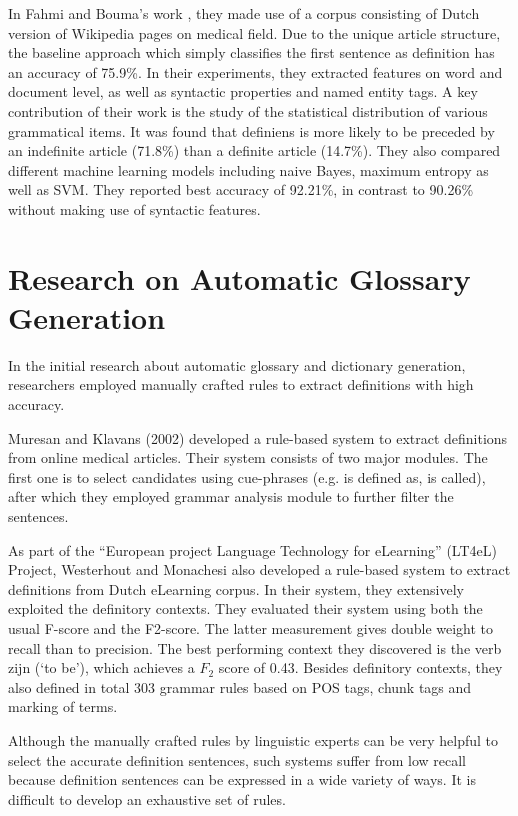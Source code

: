 \documentclass[hyp]{socreport}
\begin{document}
In Fahmi and Bouma's work \cite{Fahmi06learningto}, they made use of a corpus consisting of Dutch version of Wikipedia pages on medical field. Due to the unique article structure, the baseline approach which simply classifies the first sentence as definition has an accuracy of 75.9\%. In their experiments, they extracted features on word and document level, as well as syntactic properties and named entity tags. A key contribution of their work is the study of the statistical distribution of various grammatical items. It was found that definiens is more likely to be preceded by an indefinite article (71.8\%) than a definite article (14.7\%). They also compared different machine learning models including naive Bayes, maximum entropy as well as SVM. They reported best accuracy of 92.21\%, in contrast to 90.26\% without making use of syntactic features.

\section{Research on Automatic Glossary Generation}

In the initial research about automatic glossary and dictionary generation, researchers employed manually crafted rules to extract definitions with high accuracy. 

Muresan and Klavans (2002) developed a rule-based system to extract definitions from online medical articles. Their system consists of two major modules. The first one is to select candidates using cue-phrases (e.g. is defined as, is called), after which they employed grammar analysis module to further filter the sentences. 

As part of the ``European project Language Technology for eLearning'' (LT4eL) Project, Westerhout and Monachesi \cite{westerhout07} also developed a rule-based system to extract definitions from Dutch eLearning corpus. In their system, they extensively exploited the definitory contexts. They evaluated their system using both the usual F-score and the F­2-score. The latter measurement gives double weight to recall than to precision. The best performing context they discovered is the verb zijn (`to be'), which achieves a $F_2$ score of 0.43. Besides definitory contexts, they also defined in total 303 grammar rules based on POS tags, chunk tags and marking of terms. 

Although the manually crafted rules by linguistic experts can be very helpful to select the accurate definition sentences, such systems suffer from low recall because definition sentences can be expressed in a wide variety of ways. It is difficult to develop an exhaustive set of rules.
\end{document}
